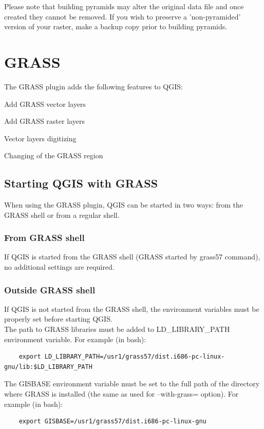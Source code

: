 \documentclass[10pt,english]{article}
\begin{document}
\begin{onehalfspace}
Please note that building pyramids may alter the original data file and once created they cannot be removed. If you wish to preserve a 'non-pyramided' version of your raster, make a backup copy prior to building pyramids.
\section{GRASS}\label{sec:grass}
The GRASS plugin adds the following features to QGIS:
\begin{compactitem}
\item Add GRASS vector layers
\item Add GRASS raster layers
\item Vector layers digitizing
\item Changing of the GRASS region
\end{compactitem}
\subsection{Starting QGIS with
GRASS}\label{sec:starting_grass}
When using the GRASS plugin, QGIS can be started in two ways: from the GRASS shell or from a regular shell.
\subsubsection{From GRASS shell}

If QGIS is started from the GRASS shell (GRASS started by grass57 command), no
additional settings are required. 
\subsubsection{Outside GRASS shell}

If QGIS is not started from the GRASS shell, the environment variables must be properly set before starting QGIS.\\
 
The path to GRASS libraries must be added to LD\_LIBRARY\_PATH environment
variable. For example (in bash): 
\begin{verbatim}
    export LD_LIBRARY_PATH=/usr1/grass57/dist.i686-pc-linux-gnu/lib:$LD_LIBRARY_PATH
\end{verbatim}    
 
The GISBASE environment variable must be set to the full path of the directory where GRASS is installed (the same as used for --with-grass= option). For example (in bash):
\begin{verbatim}
    export GISBASE=/usr1/grass57/dist.i686-pc-linux-gnu 
\end{verbatim}

\end{onehalfspace}
\end{document}
